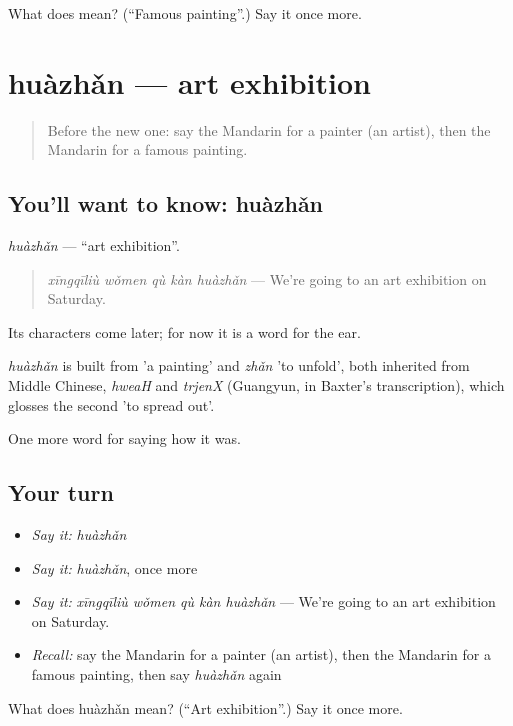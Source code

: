 \begin{tcolorbox}[breakable,colback=teal!4,colframe=teal!35!black,title={Before you move on}]
What does  mean? (\textquotedblleft{}Famous painting\textquotedblright{}.) Say it once more.
\end{tcolorbox}
\section[huàzhǎn]{huàzhǎn — art exhibition}

\label{lesson:ZH-C502-huazhan}



\begin{quote}
Before the new one: say the Mandarin for a painter (an artist), then the Mandarin for a famous painting.
\end{quote}

\subsection*{You'll want to know: huàzhǎn}
\emph{huàzhǎn} — \textquotedblleft{}art exhibition\textquotedblright{}.

\begin{quote}
\emph{xīngqīliù wǒmen qù kàn huàzhǎn} — We're going to an art exhibition on Saturday.
\end{quote}

Its characters come later; for now it is a word for the ear.

\begin{cousinweb}
\emph{huàzhǎn} is built from  'a painting' and \emph{zhǎn} 'to unfold', both inherited from Middle Chinese, \emph{hweaH} and \emph{trjenX} (Guangyun, in Baxter's transcription), which glosses the second 'to spread out'.
\end{cousinweb}

\begin{grammarlens}[title={What you've built}]
One more word for saying how it was.
\end{grammarlens}

\subsection*{Your turn}
\begin{itemize}
\raggedright
  \item \emph{Say it:} \emph{huàzhǎn}
  \item \emph{Say it:} \emph{huàzhǎn}, once more
  \item \emph{Say it:} \emph{xīngqīliù wǒmen qù kàn huàzhǎn} — We're going to an art exhibition on Saturday.
  \item \emph{Recall:} say the Mandarin for a painter (an artist), then the Mandarin for a famous painting, then say \emph{huàzhǎn} again
\end{itemize}

\begin{tcolorbox}[breakable,colback=teal!4,colframe=teal!35!black,title={Before you move on}]
What does huàzhǎn mean? (\textquotedblleft{}Art exhibition\textquotedblright{}.) Say it once more.
\end{tcolorbox}
